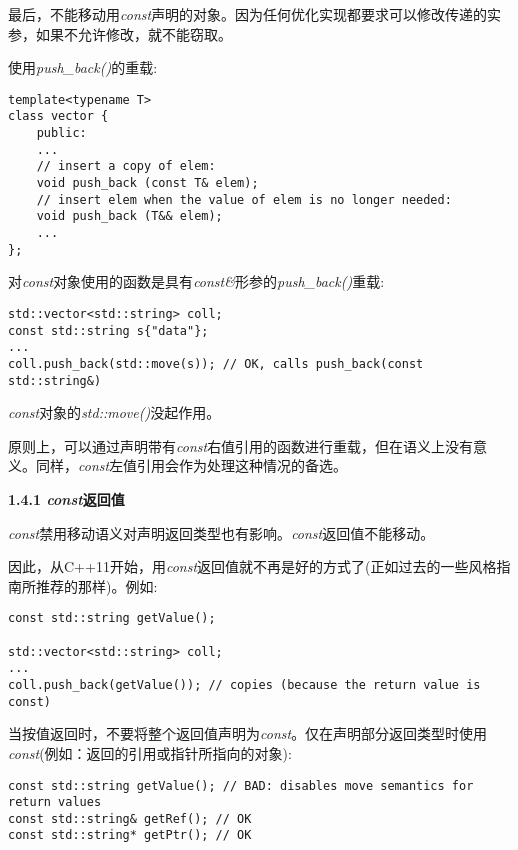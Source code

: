 最后，不能移动用\textit{const}声明的对象。因为任何优化实现都要求可以修改传递的实参，如果不允许修改，就不能窃取。\par

使用\textit{push\_back()}的重载:\par

\begin{lstlisting}[caption={}]
template<typename T>
class vector {
	public:
	...
	// insert a copy of elem:
	void push_back (const T& elem);
	// insert elem when the value of elem is no longer needed:
	void push_back (T&& elem);
	...
};
\end{lstlisting}

对\textit{const}对象使用的函数是具有\textit{const\&}形参的\textit{push\_back()}重载:\par

\begin{lstlisting}[caption={}]
std::vector<std::string> coll;
const std::string s{"data"};
...
coll.push_back(std::move(s)); // OK, calls push_back(const std::string&)
\end{lstlisting}

\textit{const}对象的\textit{std::move()}没起作用。\par

原则上，可以通过声明带有\textit{const}右值引用的函数进行重载，但在语义上没有意义。同样，\textit{const}左值引用会作为处理这种情况的备选。\par

\hspace*{\fill} \par %
\textbf{1.4.1 \textit{const}返回值}

\textit{const}禁用移动语义对声明返回类型也有影响。\textit{const}返回值不能移动。\par

因此，从C++11开始，用\textit{const}返回值就不再是好的方式了(正如过去的一些风格指南所推荐的那样)。例如:\par

\begin{lstlisting}[caption={}]
const std::string getValue();

std::vector<std::string> coll;
...
coll.push_back(getValue()); // copies (because the return value is const)
\end{lstlisting}

当按值返回时，不要将整个返回值声明为\textit{const}。仅在声明部分返回类型时使用\textit{const}(例如：返回的引用或指针所指向的对象):\par

\begin{lstlisting}[caption={}]
const std::string getValue(); // BAD: disables move semantics for return values
const std::string& getRef(); // OK
const std::string* getPtr(); // OK
\end{lstlisting}






